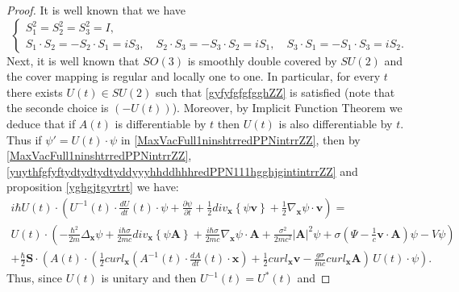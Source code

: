 \documentclass{article}
\theoremstyle{definition}
\theoremstyle{remark}
\renewcommand{\vec}[1]{\mathbf{#1}}
\newcommand{\er}{\eqref}
\newcommand{\er}{\eqref}
\begin{document}
\begin{proof}
It is well known that we have
\begin{equation}\label{gyjyfghfZZ}
\begin{cases}
S^2_1=S^2_2=S^2_3=I,\\
S_1\cdot S_2=-S_2\cdot S_1=iS_3,\quad S_2\cdot S_3=-S_3\cdot
S_2=iS_1,\quad S_3\cdot S_1=-S_1\cdot S_3=iS_2.
\end{cases}
\end{equation}
Next, it is well known that $SO(3)$ is smoothly double covered by
$SU(2)$ and the cover mapping is regular and locally one to one. In
particular, for every $t$ there exists $U(t)\in SU(2)$ such that
\er{gyfyfgfgfgghZZ} is satisfied
(note that the seconde choice is $(-U(t))$). Moreover, by Implicit
Function Theorem we deduce that if $A(t)$ is differentiable by $t$
then $U(t)$ is also differentiable by $t$. Thus if
$\psi'=U(t)\cdot\psi$ in \er{MaxVacFull1ninshtrredPPNintrrZZ}, then
by \er{MaxVacFull1ninshtrredPPNintrrZZ},
\er{yuythfgfyftydtydtydtyddyyyhhddhhhredPPN111hgghjgintintrrZZ} and
proposition \ref{yghgjtgyrtrt}
we have:
\begin{multline}\label{MaxVacFull1ninshtrredPPNintrrghghZZ}
i\hbar
U(t)\cdot\left(U^{-1}(t)\cdot\frac{dU}{dt}(t)\cdot\psi+\frac{\partial\psi}{\partial
t}+\frac{1}{2}div_{\vec x}\left\{\psi\vec
v\right\}+\frac{1}{2}\nabla_{\vec x}\psi\cdot\vec v\right)
=\\U(t)\cdot\left(-\frac{\hbar^2}{2m}\Delta_{\vec
x}\psi+\frac{i\hbar\sigma}{2mc}div_{\vec x}\left\{\psi\vec
A\right\}+\frac{i\hbar\sigma}{2mc}\nabla_{\vec x}\psi\cdot\vec
A+\frac{\sigma^2}{2mc^2}\left|\vec A\right|^2\psi
%
%
%
+\sigma\left(\Psi-\frac{1}{c}\vec v\cdot\vec
A\right)\psi-V\psi\right)\\+\frac{\hbar}{2}\vec
S\cdot\left(A(t)\cdot\left(\frac{1}{2}curl_{\vec
x}\left(A^{-1}(t)\cdot\frac{dA}{dt}(t)\cdot \vec
x\right)+\frac{1}{2}curl_{\vec x}\vec v-\frac{g\sigma}{mc}curl_{\vec
x}\vec A\right)\,U(t)\cdot\psi\right).
\end{multline}
Thus, since $U(t)$ is unitary and then $U^{-1}(t)=U^*(t)$ and

\end{proof}
\end{document}

